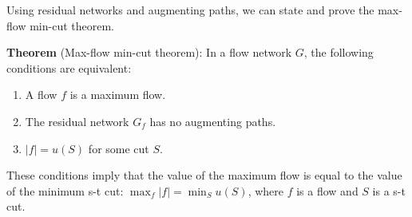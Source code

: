 \documentclass{article}
\begin{document}
Using residual networks and augmenting paths, we can state and prove
the max-flow min-cut theorem.


\textbf{Theorem} (Max-flow min-cut theorem):
In a flow network $G$, the following conditions are equivalent:

\begin{enumerate}
 \item  A flow $f$ is a maximum flow.
 \item  The residual network $G_f$ has no augmenting paths.
 \item  $|f| = u(S)$ for some cut $S$.
\end{enumerate}
These conditions imply that the value of the maximum flow is equal
to the value of the minimum s-t cut: $\max_f |f|=\min_S u(S)$,
where $f$ is a flow and $S$ is a s-t cut.
\end{document}

